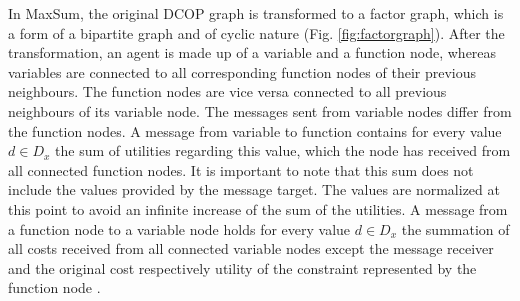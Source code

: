 In MaxSum, the original DCOP graph is transformed to a factor graph, which is a form of a bipartite graph and of cyclic nature (Fig. \ref{fig:factorgraph}). After the transformation, an agent is made up of a variable and a function node, whereas variables are connected to all corresponding function nodes of  their previous neighbours. The function nodes are vice versa connected to all previous neighbours of its variable node. 
The messages sent from variable nodes differ from the function nodes. A message from variable to function contains for every value \(d \in D_{x}\) the sum of utilities regarding this value, which the node has received from all connected function nodes. It is important to note that this sum does not include the values provided by the message target. The values are normalized at this point to avoid an infinite increase of the sum of the utilities. A message from a function node to a variable node holds for every value  \(d \in D_{x}\)  the summation of all costs received from all connected variable nodes except the message receiver and the original cost respectively utility of the constraint represented by the function node \cite{Zivan2012}.


    
    